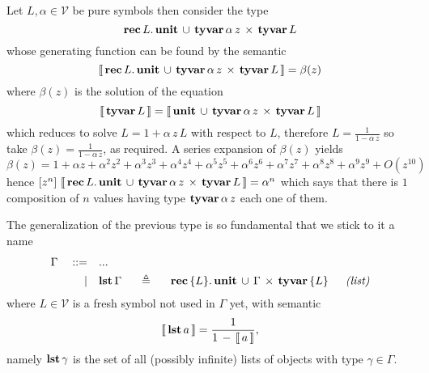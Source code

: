 \begin{example}
Let $L,\alpha\in\mathcal{V}$ be pure symbols then consider the type
\begin{displaymath}
    \textbf{rec}\,L.\,\textbf{unit}\,\cup\,\textbf{tyvar}\,\alpha\,z\,\times\,\textbf{tyvar}\,L
\end{displaymath}
whose generating function can be found by the semantic
\begin{displaymath}
    \left\llbracket\,\textbf{rec}\,L.\,\textbf{unit}\,\cup\,\textbf{tyvar}\,\alpha\,z\,\times\,\textbf{tyvar}\,L\,\right\rrbracket = \beta(z)
\end{displaymath}
where $\beta(z)$ is the solution of the equation
\begin{displaymath}
    \left\llbracket\,\textbf{tyvar}\,L\,\right\rrbracket = \left\llbracket\,\textbf{unit}\,\cup\,\textbf{tyvar}\,\alpha\,z\,\times\,\textbf{tyvar}\,L\,\right\rrbracket
\end{displaymath}
which reduces to solve $L = 1 + \alpha\,z\,L$ with respect to $L$, therefore
$\displaystyle L = \frac{1}{1 - \alpha\,z}$ so take $\displaystyle \beta(z) =
\frac{1}{1 - \alpha\,z}$, as required.  A series expansion of $\beta(z)$ yields
\begin{displaymath}
\beta(z) = 1 + \alpha z + \alpha^{2} z^{2} + \alpha^{3} z^{3} + \alpha^{4} z^{4} + \alpha^{5} z^{5} + \alpha^{6} z^{6} + \alpha^{7} z^{7} + \alpha^{8} z^{8} + \alpha^{9} z^{9} + O\left(z^{10}\right)
\end{displaymath}
hence $[z^{n}]\,\left\llbracket\,\textbf{rec}\,L.\,\textbf{unit}\,\cup\,\textbf{tyvar}\,\alpha\,z\,\times\,\textbf{tyvar}\,L\,\right\rrbracket = \alpha^{n}$ 
which says that there is $1$ composition of $n$ values having type
$\textbf{tyvar}\,\alpha\,z$ each one of them.
\end{example}

\begin{definition}
The generalization of the previous type is so fundamental that we stick to it a name
\begin{displaymath}
\begin{split}
    \Gamma\quad::=\quad&... \\
           |\quad&\tydef{\tylst{\Gamma}}{\tyrec{ \lbrace L \rbrace}{\tydu{\tyunit}{\tycp{\Gamma}{\tyvar{ \lbrace L \rbrace}}}}}{list}
\end{split}
\end{displaymath}
where $L\in\mathcal{V}$ is a fresh symbol not used in $\Gamma$ yet, with semantic
\begin{displaymath}
    \left\llbracket\,\textbf{lst}\,a\,\right\rrbracket = \frac{1}{1\,-\,\left\llbracket\,a\,\right\rrbracket},
\end{displaymath}
namely $\textbf{lst}\,\gamma$ is the set of all (possibly infinite) lists of
objects with type $\gamma\in\Gamma$. 
\end{definition}

